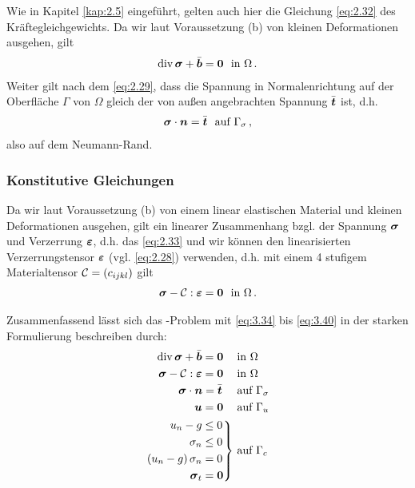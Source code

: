 Wie in Kapitel \ref{kap:2.5} eingeführt, gelten auch hier die Gleichung \eqref{eq:2.32} des Kräftegleichgewichts. Da wir laut Voraussetzung (b) von kleinen Deformationen ausgehen, gilt
\begin{align}\label{eq:3.38}
	\operatorname{div}\boldsymbol \sigma + \bar{\boldsymbol b} = \boldsymbol 0 \ \text{ in } \Omega\, .
\end{align}
Weiter gilt nach dem  \eqref{eq:2.29}, dass die Spannung in Normalenrichtung auf der Oberfläche $\Gamma$ von $\Omega$ gleich der von außen angebrachten Spannung $\bar{\boldsymbol t}$ ist, d.h.
\begin{align}\label{eq:3.39}
	\boldsymbol \sigma \cdot \boldsymbol n = \bar{\boldsymbol t} \ \text{ auf } \Gamma_\sigma \, ,
\end{align}
also auf dem Neumann-Rand.



\subsubsection{Konstitutive Gleichungen}



Da wir laut Voraussetzung (b) von einem linear elastischen Material und kleinen Deformationen ausgehen, gilt ein linearer Zusammenhang bzgl. der Spannung $\boldsymbol \sigma$ und Verzerrung $\boldsymbol {\varepsilon}$, d.h. das  \eqref{eq:2.33} und wir können  den linearisierten Verzerrungstensor $\boldsymbol {\varepsilon}$ (vgl. \eqref{eq:2.28}) verwenden, d.h. mit einem 4 stufigem Materialtensor $\mathcal C = (c_{ijkl})$ gilt
\begin{align}\label{eq:3.40}
	\boldsymbol \sigma - \mathcal C : \boldsymbol {\varepsilon} = \boldsymbol 0 \ \text{ in } \Omega \, .
\end{align}


Zusammenfassend lässt sich das -Problem mit \eqref{eq:3.34} bis \eqref{eq:3.40} in der starken Formulierung beschreiben durch:
\begin{subequations}\label{eq:3.41}
\begin{align}\label{eq:3.41a}
	\operatorname{div} \boldsymbol \sigma + \bar{\boldsymbol b} = \boldsymbol 0\ \ \: & \text{ in } \Omega\\
	\label{eq:3.41b}
	\boldsymbol \sigma  - \mathcal C :\boldsymbol {\varepsilon}  = \boldsymbol 0\ \ \: & \text{ in } \Omega\\
	\label{eq:3.41c}
	\boldsymbol \sigma \cdot \boldsymbol n = \bar{\boldsymbol t} \ \ \ & \text{ auf } \Gamma_\sigma \\
	\label{eq:3.41d}
	\boldsymbol u = \boldsymbol 0 \ \  \: & \text{ auf }\Gamma_u \\
	\label{eq:3.41e}
	\left.
	\begin{aligned}
		 u_n  - g& \le 0 \\
		\sigma_n &\le 0 \\
		(u_n  - g)\,  \sigma_n &= 0  \\
		\boldsymbol \sigma_t &= \boldsymbol 0
	\end{aligned} \right\} &
\text{ auf } \Gamma_c  
\end{align}
\end{subequations}



